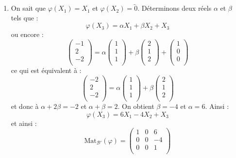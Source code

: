 \documentclass[a4paper,10pt]{report}
\begin{document}
\begin{enumerate}
\item On sait que $\varphi(X_1)=X_1$ et $\varphi(X_2) = \tilde{0}$. Déterminons deux réels $\alpha$ et $\beta$ tels que :
$$ \varphi(X_3) = \alpha X_1 + \beta X_2 + X_3$$
ou encore :
$$ \begin{pmatrix}
-1 \\
2 \\
-2 \\
\end{pmatrix} = \alpha \begin{pmatrix}
1 \\
1 \\
1 \\
\end{pmatrix} + \beta \begin{pmatrix}
2 \\
1 \\
2 \\
\end{pmatrix} + \begin{pmatrix}
1 \\
0\\
0\\
\end{pmatrix}$$
ce qui est équivalent à :
$$  \begin{pmatrix}
-2 \\
2 \\
-2 \\
\end{pmatrix} = \alpha \begin{pmatrix}
1 \\
1 \\
1 \\
\end{pmatrix} + \beta \begin{pmatrix}
2 \\
1 \\
2 \\
\end{pmatrix} $$
et donc à $\alpha+ 2\beta =-2$ et $\alpha+ \beta = 2$. On obtient $\beta =-4$ et $\alpha =6$. Ainsi :
$$ \varphi(X_3) = 6 X_1 - 4 X_2 + X_3$$
et ainsi :
$$ \textrm{Mat}_{\mathcal{B}'}(\varphi) = \begin{pmatrix}
1 & 0 & 6 \\
0 & 0 & -4 \\
0 & 0 & 1 \\
\end{pmatrix}$$
\end{enumerate}

\medskip
\end{document}
